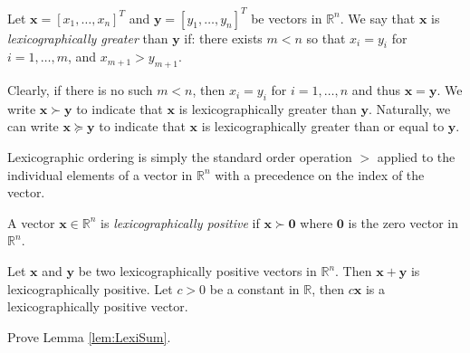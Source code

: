\begin{definition} Let $\mathbf{x}=[x_1,\dots,x_n]^T$ and $\mathbf{y}=[y_1,\dots,y_n]^T$ be vectors in $\mathbb{R}^n$. We say that $\mathbf{x}$ is \textit{lexicographically greater} than $\mathbf{y}$ if: there exists $m < n$ so that $x_i = y_i$ for $i=1,\dots,m$, and $x_{m+1} > y_{m+1}$. 

Clearly, if there is no such $m < n$, then $x_i = y_i$ for $i = 1,\dots,n$ and thus $\mathbf{x} = \mathbf{y}$. We write $\mathbf{x}\succ\mathbf{y}$ to indicate that $\mathbf{x}$ is lexicographically greater than $\mathbf{y}$. Naturally, we can write $\mathbf{x}\succeq\mathbf{y}$ to indicate that $\mathbf{x}$ is lexicographically greater than or equal to $\mathbf{y}$. 
\end{definition}

Lexicographic ordering is simply the standard order operation $>$ applied to the individual elements of a vector in $\mathbb{R}^n$ with a precedence on the index of the vector.

\begin{definition} A vector $\mathbf{x} \in \mathbb{R}^n$ is \textit{lexicographically positive} if $\mathbf{x} \succ \mathbf{0}$ where $\mathbf{0}$ is the zero vector in $\mathbb{R}^n$. 
\end{definition}

\begin{lemma} Let $\mathbf{x}$ and $\mathbf{y}$ be two lexicographically positive vectors in $\mathbb{R}^n$. Then $\mathbf{x} + \mathbf{y}$ is lexicographically positive. Let $c > 0$ be a constant in $\mathbb{R}$, then $c\mathbf{x}$ is a lexicographically positive vector.
\label{lem:LexiSum}
\end{lemma}

\begin{exercise} Prove Lemma \ref{lem:LexiSum}. 
\end{exercise}

